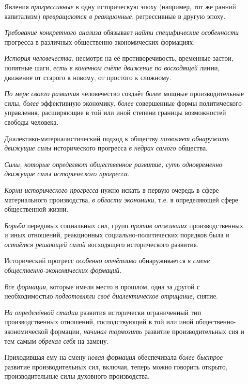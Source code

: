\documentclass[a4paper,14pt,russian]{extreport}
\begin{document}
Явления \emph{прогрессивные} в одну историческую эпоху (например, тот же ранний капитализм) \emph{превращаются в реакционные}, регрессивные в другую эпоху.

\emph{Требование конкретного анализа} обязывает \emph{найти специфические особенности} прогресса в различных общественно-экономических формациях.

\emph{История человечества}, несмотря на её противоречивость, временные застои, попятные шаги, \emph{есть в конечном счёте движение по восходящей} линии, движение от старого к новому, от простого к сложному.

\emph{По мере своего развития} человечество создаёт \emph{более} мощные производительные силы, \emph{более} эффективную экономику, \emph{более} совершенные формы политического управления, расширяющие в той или иной степени границы возможностей свободы человека.

Диалектико-материалистический подход к обществу \emph{позволяет обнаружить движущие силы} исторического прогресса \emph{в недрах самого} общества.

\emph{Силы, которые определяют общественное развитие, суть одновременно движущие силы исторического прогресса}.

\emph{Корни исторического прогресса} нужно искать в первую очередь в сфере материального производства, \emph{в области экономики}, т.е. в определяющей сфере общественной жизни.

\emph{Борьба} передовых социальных сил, групп \emph{против отживших} производственных и иных отношений, реакционных социально-политических порядков была и \emph{остаётся решающей силой} восходящего исторического развития.

Исторический прогресс \emph{особенно отчётливо} обнаруживается \emph{в смене общественно-экономических формаций}.

\emph{Все формации}, которые имели место в прошлом, одна за другой с необходимостью \emph{подготовляли своё диалектическое отрицание}, снятие.

\emph{На определённой стадии} развития исторически ограниченный тип производственных отношений, господствующий в той или иной общественно-экономической формации, \emph{начинал тормозить} развитие производительных сия и тем самым \emph{обрекал себя} на замену.

Приходившая ему на смену \emph{новая формация} обеспечивала \emph{более быстрое} развитие производительных сил, включая, теперь можно говорить открыто, производительные силы духовного производства.
\end{document}

